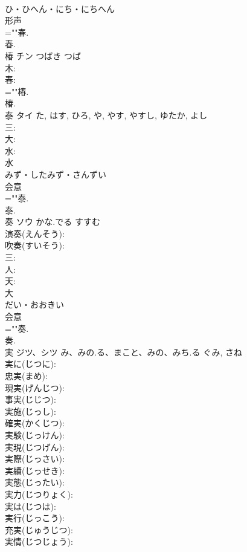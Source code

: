 \documentclass[8pt]{extreport}
\begin{document}
\begin{CJK}{UTF8}{min}
\\	ひ・ひへん・にち・にちへん	
\\	形声 
\\	=""春.
\\	春.
\\	椿	チン	つばき	つば	
\\	木: 
\\	春: 
\\	=""椿.
\\	椿.
\\	泰	タイ		た, はす, ひろ, や, やす, やすし, ゆたか, よし	
\\	三: 
\\	大: 
\\	水: 
\\	水	
\\	みず・したみず・さんずい	
\\	会意 
\\	=""泰.
\\	泰.
\\	奏	ソウ	かな.でる	すすむ	
\\	演奏(えんそう): 
\\	吹奏(すいそう): 
\\	三: 
\\	人: 
\\	天: 
\\	大	
\\	だい・おおきい	
\\	会意 
\\	=""奏.
\\	奏.
\\	実	ジツ、シツ	み、みの.る、まこと、みの、みち.る	ぐみ, さね	
\\	実に(じつに): 
\\	忠実(まめ): 
\\	現実(げんじつ): 
\\	事実(じじつ): 
\\	実施(じっし): 
\\	確実(かくじつ): 
\\	実験(じっけん): 
\\	実現(じつげん): 
\\	実際(じっさい): 
\\	実績(じっせき): 
\\	実態(じったい): 
\\	実力(じつりょく): 
\\	実は(じつは): 
\\	実行(じっこう): 
\\	充実(じゅうじつ): 
\\	実情(じつじょう): 

\end{CJK}
\end{document}
